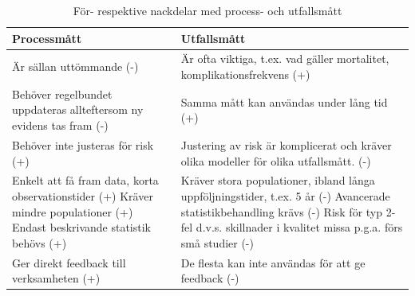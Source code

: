 \begin{table}[h]
\centering
\caption{För- respektive nackdelar med process- och utfallsmått}
\label{tab:fornack}
\begin{tabular}{|p{7cm}|p{7cm}|}
\hline
Processmått                                                                                                               & Utfallsmått                                                                                                                                                                                        \\ \hline
Är sällan uttömmande (-)                                                                                                  & Är ofta viktiga, t.ex. vad gäller mortalitet, komplikationsfrekvens (+)                                                                                                                            \\ \hline
Behöver regelbundet uppdateras allteftersom ny evidens tas fram (-)                                                       & Samma mått kan användas under lång tid (+)                                                                                                                                                         \\ \hline
Behöver inte justeras för risk (+)                                                                                        & Justering av risk är komplicerat och kräver olika modeller för olika utfallsmått. (-)                                                                                                              \\ \hline
Enkelt att få fram data, korta observationstider (+) \newline Kräver mindre populationer (+) \newline Endast beskrivande statistik behövs (+) & Kräver stora populationer, ibland långa uppföljningstider, t.ex. 5 år (-) \newline Avancerade statistikbehandling krävs (-) \newline Risk för typ 2-fel d.v.s. skillnader i kvalitet missa p.g.a. förs små studier (-) \\ \hline
Ger direkt feedback till verksamheten (+)                                                                                 & De flesta kan inte användas för att ge feedback (-)                                                                                                                                                \\ \hline
\end{tabular}
\end{table}

